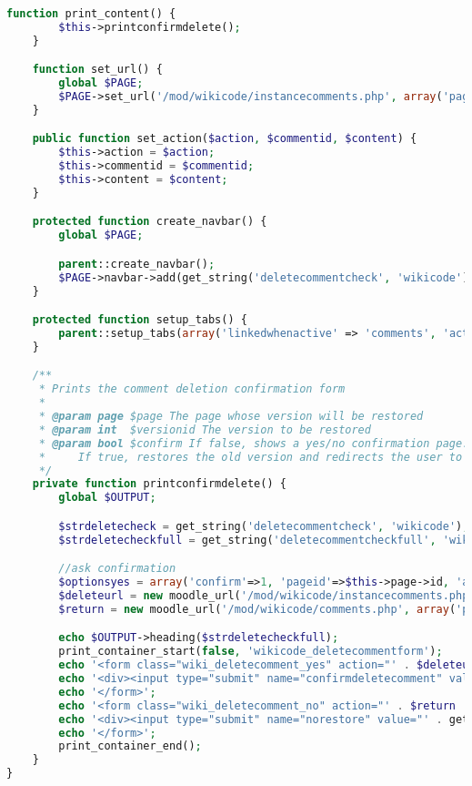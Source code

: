 \begin{lstlisting}[language=PHP]
    function print_content() {
        $this->printconfirmdelete();
    }

    function set_url() {
        global $PAGE;
        $PAGE->set_url('/mod/wikicode/instancecomments.php', array('pageid' => $this->page->id, 'commentid' => $this->commentid));
    }

    public function set_action($action, $commentid, $content) {
        $this->action = $action;
        $this->commentid = $commentid;
        $this->content = $content;
    }

    protected function create_navbar() {
        global $PAGE;

        parent::create_navbar();
        $PAGE->navbar->add(get_string('deletecommentcheck', 'wikicode'));
    }

    protected function setup_tabs() {
        parent::setup_tabs(array('linkedwhenactive' => 'comments', 'activetab' => 'comments'));
    }

    /**
     * Prints the comment deletion confirmation form
     *
     * @param page $page The page whose version will be restored
     * @param int  $versionid The version to be restored
     * @param bool $confirm If false, shows a yes/no confirmation page.
     *     If true, restores the old version and redirects the user to the 'view' tab.
     */
    private function printconfirmdelete() {
        global $OUTPUT;

        $strdeletecheck = get_string('deletecommentcheck', 'wikicode');
        $strdeletecheckfull = get_string('deletecommentcheckfull', 'wikicode');

        //ask confirmation
        $optionsyes = array('confirm'=>1, 'pageid'=>$this->page->id, 'action'=>'delete', 'commentid'=>$this->commentid, 'sesskey'=>sesskey());
        $deleteurl = new moodle_url('/mod/wikicode/instancecomments.php', $optionsyes);
        $return = new moodle_url('/mod/wikicode/comments.php', array('pageid'=>$this->page->id));

        echo $OUTPUT->heading($strdeletecheckfull);
        print_container_start(false, 'wikicode_deletecommentform');
        echo '<form class="wiki_deletecomment_yes" action="' . $deleteurl . '" method="post" id="deletecomment">';
        echo '<div><input type="submit" name="confirmdeletecomment" value="' . get_string('yes') . '" /></div>';
        echo '</form>';
        echo '<form class="wiki_deletecomment_no" action="' . $return . '" method="post">';
        echo '<div><input type="submit" name="norestore" value="' . get_string('no') . '" /></div>';
        echo '</form>';
        print_container_end();
    }
}


\end{lstlisting}
